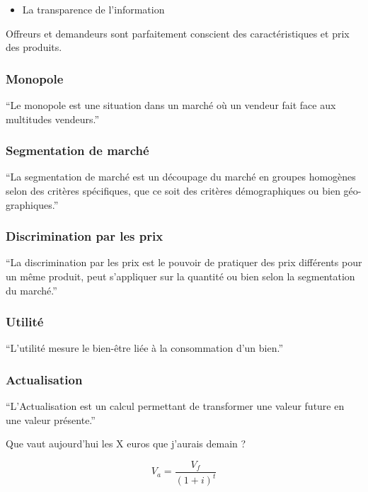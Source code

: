 \documentclass[
  letterpaper,
  DIV=11,
  numbers=noendperiod]{scrartcl}
\providecommand{\tightlist}{%
  \setlength{\itemsep}{0pt}\setlength{\parskip}{0pt}}\usepackage{longtable,booktabs,array}
\begin{document}
\begin{itemize}
\tightlist
\item
  La transparence de l'information
\end{itemize}

Offreurs et demandeurs sont parfaitement conscient des caractéristiques
et prix des produits.

\subsubsection{Monopole}\label{monopole}

``Le monopole est une situation dans un marché où un vendeur fait face
aux multitudes vendeurs.''

\subsubsection{Segmentation de marché}\label{segmentation-de-marchuxe9}

``La segmentation de marché est un découpage du marché en groupes
homogènes selon des critères spécifiques, que ce soit des critères
démographiques ou bien géo-graphiques.''

\subsubsection{Discrimination par les
prix}\label{discrimination-par-les-prix}

``La discrimination par les prix est le pouvoir de pratiquer des prix
différents pour un même produit, peut s'appliquer sur la quantité ou
bien selon la segmentation du marché.''

\subsubsection{Utilité}\label{utilituxe9}

``L'utilité mesure le bien-être liée à la consommation d'un bien.''

\subsubsection{Actualisation}\label{actualisation}

``L'Actualisation est un calcul permettant de transformer une valeur
future en une valeur présente.''

Que vaut aujourd'hui les X euros que j'aurais demain ?

\[
V_a = \frac{V_f}{(1+i)^t}
\]
\end{document}
